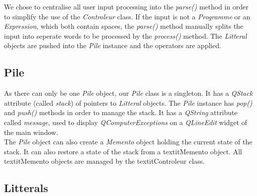 \documentclass[titlepage]{article}
\begin{document}
    We chose to centralise all user input processing into the \textit{parse()} method in order to simplify the use of the \textit{Controleur} class. If the input is not a \textit{Programme} or an \textit{Expression}, which both contain spaces, the \textit{parse()} method manually splits the input into seperate words to be processed by the \textit{process()} method. The \textit{Litteral} objects are pushed into the \textit{Pile} instance and the operators are applied.

    \subsection{Pile}

    As there can only be one \textit{Pile} object, our \textit{Pile} class is a singleton. It has a \textit{QStack} attribute (called \textit{stack}) of pointers to \textit{Litteral} objects. The \textit{Pile} instance has \textit{pop()} and \textit{push()} methods in order to manage the stack. It has a \textit{QString} attribute called \textit{message}, used to display \textit{QComputerExceptions} on a \textit{QLineEdit} widget of the main window.\\
    The \textit{Pile} object can also create a \textit{Memento} object holding the current state of the stack. It can also restore a state of the stack from a textit{Memento} object. All textit{Memento} objects are managed by the textit{Controleur} class.

    \subsection{Litterals}
\end{document}
